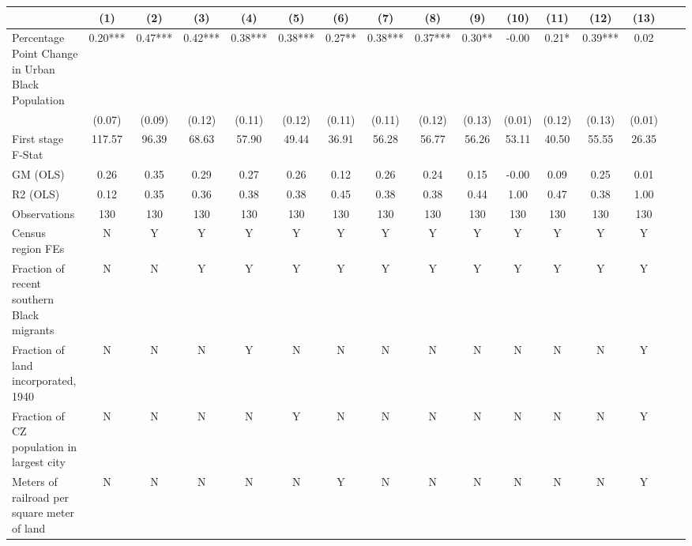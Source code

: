  \begin{tabular}{l*{15}{c}} \toprule
                    &\multicolumn{1}{c}{(1)}   &\multicolumn{1}{c}{(2)}   &\multicolumn{1}{c}{(3)}   &\multicolumn{1}{c}{(4)}   &\multicolumn{1}{c}{(5)}   &\multicolumn{1}{c}{(6)}   &\multicolumn{1}{c}{(7)}   &\multicolumn{1}{c}{(8)}   &\multicolumn{1}{c}{(9)}   &\multicolumn{1}{c}{(10)}   &\multicolumn{1}{c}{(11)}   &\multicolumn{1}{c}{(12)}   &\multicolumn{1}{c}{(13)}   \\
\midrule
Percentage Point Change in Urban Black Population&  0.20***&  0.47***&  0.42***&  0.38***&  0.38***&  0.27** &  0.38***&  0.37***&  0.30** & -0.00   &  0.21*  &  0.39***&  0.02   \\
                    &(0.07)   &(0.09)   &(0.12)   &(0.11)   &(0.12)   &(0.11)   &(0.11)   &(0.12)   &(0.13)   &(0.01)   &(0.12)   &(0.13)   &(0.01)   \\
\midrule
First stage F-Stat  &117.57   & 96.39   & 68.63   & 57.90   & 49.44   & 36.91   & 56.28   & 56.77   & 56.26   & 53.11   & 40.50   & 55.55   & 26.35   \\
GM (OLS)            &  0.26   &  0.35   &  0.29   &  0.27   &  0.26   &  0.12   &  0.26   &  0.24   &  0.15   & -0.00   &  0.09   &  0.25   &  0.01   \\
R2 (OLS)            &  0.12   &  0.35   &  0.36   &  0.38   &  0.38   &  0.45   &  0.38   &  0.38   &  0.44   &  1.00   &  0.47   &  0.38   &  1.00   \\
Observations        &   130   &   130   &   130   &   130   &   130   &   130   &   130   &   130   &   130   &   130   &   130   &   130   &   130   \\
Census region FEs   &     N   &     Y   &     Y   &     Y   &     Y   &     Y   &     Y   &     Y   &     Y   &     Y   &     Y   &     Y   &     Y   \\
Fraction of recent southern Black migrants&     N   &     N   &     Y   &     Y   &     Y   &     Y   &     Y   &     Y   &     Y   &     Y   &     Y   &     Y   &     Y   \\
Fraction of land incorporated, 1940&     N   &     N   &     N   &     Y   &     N   &     N   &     N   &     N   &     N   &     N   &     N   &     N   &     Y   \\
Fraction of CZ population in largest city&     N   &     N   &     N   &     N   &     Y   &     N   &     N   &     N   &     N   &     N   &     N   &     N   &     Y   \\
Meters of railroad per square meter of land&     N   &     N   &     N   &     N   &     N   &     Y   &     N   &     N   &     N   &     N   &     N   &     N   &     Y   \\

\end{tabular}
